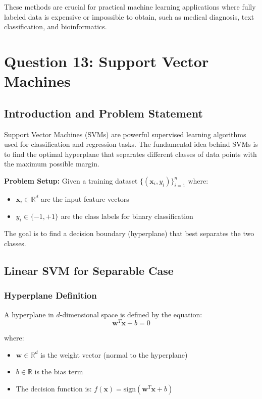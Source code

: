 \documentclass[12pt,a4paper]{article}
\begin{document}
These methods are crucial for practical machine learning applications where fully labeled data is expensive or impossible to obtain, such as medical diagnosis, text classification, and bioinformatics.

\newpage

\section{ Question 13: Support Vector Machines}

\subsection{Introduction and Problem Statement}

Support Vector Machines (SVMs) are powerful supervised learning algorithms used for classification and regression tasks. The fundamental idea behind SVMs is to find the optimal hyperplane that separates different classes of data points with the maximum possible margin.

\textbf{Problem Setup:} Given a training dataset $\{(\mathbf{x}_i, y_i)\}_{i=1}^n$ where:
\begin{itemize}
    \item $\mathbf{x}_i \in \mathbb{R}^d$ are the input feature vectors
    \item $y_i \in \{-1, +1\}$ are the class labels for binary classification
\end{itemize}

The goal is to find a decision boundary (hyperplane) that best separates the two classes.

\subsection{Linear SVM for Separable Case}

\subsubsection{Hyperplane Definition}
A hyperplane in $d$-dimensional space is defined by the equation:
\begin{equation}
\mathbf{w}^T\mathbf{x} + b = 0
\end{equation}

where:
\begin{itemize}
    \item $\mathbf{w} \in \mathbb{R}^d$ is the weight vector (normal to the hyperplane)
    \item $b \in \mathbb{R}$ is the bias term
    \item The decision function is: $f(\mathbf{x}) = \text{sign}(\mathbf{w}^T\mathbf{x} + b)$
\end{itemize}
\end{document}
